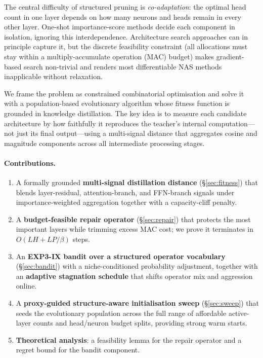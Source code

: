 \documentclass{article}
\begin{document}
The central difficulty of structured pruning is \emph{co-adaptation}:
the optimal head count in one layer depends on how many neurons and
heads remain in every other layer.  One-shot importance-score methods
decide each component in isolation, ignoring this interdependence.
Architecture search approaches can in principle capture it, but the
discrete feasibility constraint (all allocations must stay within a
multiply-accumulate operation (MAC) budget) makes gradient-based
search non-trivial and renders most differentiable NAS methods
inapplicable without relaxation.

We frame the problem as constrained combinatorial optimisation and solve
it with a population-based evolutionary algorithm whose fitness function
is grounded in knowledge distillation.  The key idea is to measure each
candidate architecture by how faithfully it reproduces the teacher's
internal computation—not just its final output—using a multi-signal
distance that aggregates cosine and magnitude components across all
intermediate processing stages.

\paragraph{Contributions.}
\begin{enumerate}[leftmargin=*,label=(\roman*)]
  \item A formally grounded \textbf{multi-signal distillation distance}
        (\S\ref{sec:fitness}) that blends layer-residual, attention-branch,
        and FFN-branch signals under importance-weighted aggregation
        together with a capacity-cliff penalty.
  \item A \textbf{budget-feasible repair operator} (\S\ref{sec:repair})
        that protects the most important layers while trimming excess MAC
        cost; we prove it terminates in $O(LH + L P/\beta)$ steps.
  \item An \textbf{EXP3-IX bandit over a structured operator vocabulary}
        (\S\ref{sec:bandit}) with a niche-conditioned probability
        adjustment, together with an \textbf{adaptive stagnation
        schedule} that shifts operator mix and aggression online.
  \item A \textbf{proxy-guided structure-aware initialisation sweep}
        (\S\ref{sec:sweep}) that seeds the evolutionary population across
        the full range of affordable active-layer counts and head/neuron
        budget splits, providing strong warm starts.
  \item \textbf{Theoretical analysis}: a feasibility lemma for the repair
        operator and a regret bound for the bandit component.
\end{enumerate}
\end{document}

